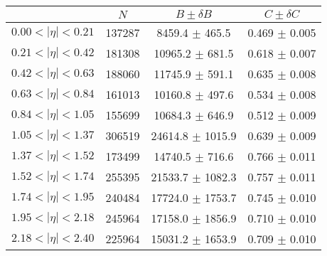 \begin{tabular}{lccc}
\hline
    &   $N$   & $B \pm \delta B$  &  $C \pm \delta C$ \\
\hline
$0.00 < |\eta| <0.21$          & 137287     & 8459.4     $\pm$ 465.5 & 0.469      $\pm$ 0.005 \\
$0.21 < |\eta| <0.42$          & 181308     & 10965.2    $\pm$ 681.5 & 0.618      $\pm$ 0.007 \\
$0.42 < |\eta| <0.63$          & 188060     & 11745.9    $\pm$ 591.1 & 0.635      $\pm$ 0.008 \\
$0.63 < |\eta| <0.84$          & 161013     & 10160.8    $\pm$ 497.6 & 0.534      $\pm$ 0.008 \\
$0.84 < |\eta| <1.05$          & 155699     & 10684.3    $\pm$ 646.9 & 0.512      $\pm$ 0.009 \\
$1.05 < |\eta| <1.37$          & 306519     & 24614.8    $\pm$ 1015.9 & 0.639      $\pm$ 0.009 \\
$1.37 < |\eta| <1.52$          & 173499     & 14740.5    $\pm$ 716.6 & 0.766      $\pm$ 0.011 \\
$1.52 < |\eta| <1.74$          & 255395     & 21533.7    $\pm$ 1082.3 & 0.757      $\pm$ 0.011 \\
$1.74 < |\eta| <1.95$          & 240484     & 17724.0    $\pm$ 1753.7 & 0.745      $\pm$ 0.010 \\
$1.95 < |\eta| <2.18$          & 245964     & 17158.0    $\pm$ 1856.9 & 0.710      $\pm$ 0.010 \\
$2.18 < |\eta| <2.40$          & 225964     & 15031.2    $\pm$ 1653.9 & 0.709      $\pm$ 0.010 \\
\hline
\end{tabular}
